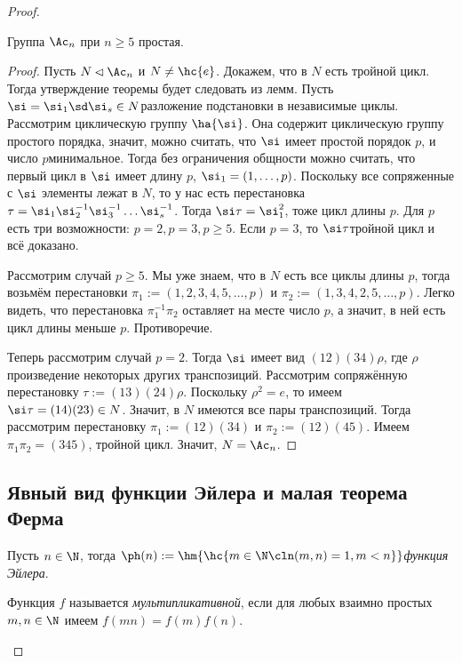 \documentclass[a4paper]{article}
\begin{document}
\begin{proof}
\begin{theorem}
Группа $\Ac_n$ при $n \ge 5$ простая.
\end{theorem}
\begin{proof}
Пусть $N \lhd \Ac_n$ и $N \neq \hc{e}$. Докажем, что в $N$ есть тройной цикл.  Тогда утверждение теоремы
будет следовать из лемм. Пусть $\si = \si_1\sd \si_s \in N$\т разложение подстановки в независимые циклы.
Рассмотрим циклическую группу $\ha{\si}$. Она содержит циклическую группу простого порядка, значит, можно
считать, что $\si$ имеет простой порядок $p$, и число $p$\т минимальное. Тогда без ограничения общности можно
считать, что первый цикл в $\si$ имеет длину $p$,  $\si_1 = (1,\ldots,p)$. Поскольку все сопряженные с
$\si$ элементы лежат в $N$, то у нас есть перестановка $\tau=\si_1\si_2^{-1}\si_3^{-1}\ldots\si_s^{-1}$.
Тогда $\si\tau = \si_1^2$,  тоже цикл длины $p$. Для $p$ есть три возможности: $p=2, p=3, p \ge 5$. Если
$p=3$, то $\si\tau$\т тройной цикл и всё доказано.

Рассмотрим случай $p \ge 5$. Мы уже знаем, что в $N$ есть все циклы длины $p$, тогда возьмём перестановки
$\pi_1:=(1,2,3,4,5,\ldots,p)$ и  $\pi_2:=(1,3,4,2,5,\ldots,p)$. Легко видеть, что перестановка
$\pi_1^{-1}\pi_2$ оставляет на месте число $p$, а значит, в ней есть цикл длины меньше $p$. Противоречие.

Теперь рассмотрим случай $p=2$. Тогда $\si$ имеет вид $(12)(34)\rho$,  где $\rho$\т произведение некоторых
других транспозиций. Рассмотрим сопряжённую перестановку $\tau:=(13)(24)\rho$. Поскольку $\rho^2=e$, то имеем
$\si\tau = (14)(23) \in N$. Значит, в $N$ имеются все пары транспозиций. Тогда рассмотрим перестановку $\pi_1
:= (12)(34)$ и $\pi_2:=(12)(45)$. Имеем $\pi_1\pi_2 = (345)$,  тройной цикл. Значит, $N=\Ac_n$.
\end{proof}

\subsection{Явный вид функции Эйлера и малая теорема Ферма}
\begin{df}
Пусть $n \in \N$, тогда $\ph(n) := \hm{\hc{m \in \N\cln (m,n)=1, m < n}}$\т \emph{функция Эйлера}.
\end{df}

\begin{df}
Функция $f$ называется \emph{мультипликативной}, если для любых взаимно простых $m, n \in \N$ имеем
$f(mn)=f(m)f(n)$.
\end{df}


\end{proof}
\end{document}
